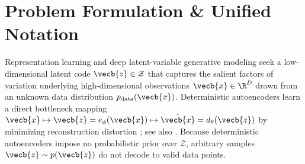 \documentclass[../../../../master.tex]{subfiles}
\begin{document}

\section{Problem Formulation \& Unified Notation}\label{sec:vae:formulation}

Representation learning and deep latent-variable generative modeling seek a low-dimensional latent code $\vecb{z} \in \mathcal{Z}$ that captures the salient factors of variation underlying high-dimensional observations $\vecb{x} \in \R^D$ drawn from an unknown data distribution $p_{\mathrm{data}}(\vecb{x})$. Deterministic autoencoders learn a direct bottleneck mapping $\vecb{x} \mapsto \vecb{z} = e_\phi(\vecb{x}) \mapsto \hat{\vecb{x}} = d_\theta(\vecb{z})$ by minimizing reconstruction distortion ; see also . Because deterministic autoencoders impose no probabilistic prior over $\mathcal{Z}$, arbitrary samples $\vecb{z} \sim p(\vecb{z})$ do not decode to valid data points.
\end{document}
